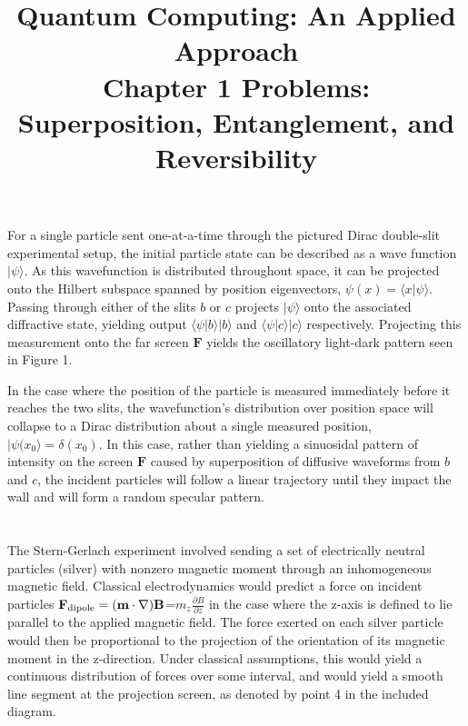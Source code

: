 \documentclass{article}
\date{}
\title{\textbf{Quantum Computing: An Applied Approach}\\\vspace*{1cm}
Chapter 1 Problems: \\
Superposition, Entanglement, and Reversibility
}
\begin{document}
\maketitle

\section{}

For a single particle sent one-at-a-time through the pictured Dirac double-slit experimental setup, the initial particle state can be described as a wave function $|\psi\rangle$. As this wavefunction is distributed throughout space, it can be projected onto the Hilbert subspace spanned by position eigenvectors, $\psi(x)=\langle x|\psi\rangle$. Passing through either of the slits $b$ or $c$ projects $|\psi\rangle$ onto the associated diffractive state, yielding output $\langle\psi|b\rangle|b\rangle$ and $\langle\psi|c\rangle|c\rangle$ respectively. Projecting this measurement onto the far screen $\mathbf{F}$ yields the oscillatory light-dark pattern seen in Figure 1.

In the case where the position of the particle is measured immediately before it reaches the two slits, the wavefunction's distribution over position space will collapse to a Dirac distribution about a single measured position, $|\psi(x_0\rangle=\delta(x_0)$. In this case, rather than yielding a sinuosidal pattern of intensity on the screen $\mathbf{F}$ caused by superposition of diffusive waveforms from $b$ and $c$, the incident particles will follow a linear trajectory until they impact the wall and will form a random specular pattern.

\section{}

The Stern-Gerlach experiment involved sending a set of electrically neutral particles (silver) with nonzero magnetic moment through an inhomogeneous magnetic field. Classical electrodynamics would predict a force on incident particles $\mathbf{F}_\textnormal{dipole}=(\textbf{m}\cdot\nabla)\textbf{B}$=$m_z\frac{\partial B}{\partial z}$ in the case where the z-axis is defined to lie parallel to the applied magnetic field. The force exerted on each silver particle would then be proportional to the projection of the orientation of its magnetic moment in the z-direction. Under classical assumptions, this would yield a continuous distribution of forces over some interval, and would yield a smooth line segment at the projection screen, as denoted by point 4 in the included diagram.
\end{document}
